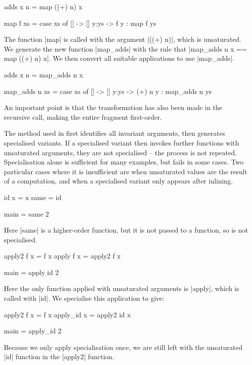 \begin{example}
\begin{code}
adds x n = map ((+) n) x

map f xs = case  xs of
                 []    -> []
                 y:ys  -> f y : map f ys
\end{code}

\noindent The function |map| is called with the argument |((+) n)|, which is unsaturated. We generate the new function |map_adds| with the rule that |map_adds n x == map ((+) n) x|. We then convert all suitable applications to use |map_adds|.

\begin{code}
adds x n = map_adds n x

map_adds n xs = case  xs of
                      []    -> []
                      y:ys  -> (+) n y : map_adds n ys
\end{code}

An important point is that the transformation has also been made in the recursive call, making the entire fragment first-order.
\end{example}

The method used in \cite{me:catch_tfp} first identifies all invariant arguments, then generates specialised variants. If a specialised variant then invokes further functions with unsaturated arguments, they are not specialised -- the process is not repeated. Specialisation alone is sufficient for many examples, but fails in some cases. Two particular cases where it is insufficient are when unsaturated values are the result of a computation, and when a specialised variant only appears after inlining.

\begin{example}
\begin{code}
id x = x
same = id

main = same 2
\end{code}

Here |same| is a higher-order function, but it is not passed to a function, so is not specialised.
\end{example}

\begin{example}
\begin{code}
apply2 f x = f x
apply f x = apply2 f x

main = apply id 2
\end{code}

Here the only function applied with unsaturated arguments is |apply|, which is called with |id|. We specialise this application to give:

\begin{code}
apply2 f x = f x
apply_id x = apply2 id x

main = apply_id 2
\end{code}

Because we only apply specialisation once, we are still left with the unsaturated |id| function in the |apply2| function.
\end{example}

